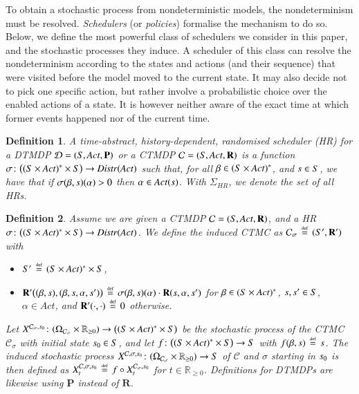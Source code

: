 \documentclass[10pt,twocolumn]{article}
\newtheorem{definition}{Definition}
\newcommand{\states} {{\ensuremath S}}
\newcommand{\state}  {{\ensuremath s}}
\newcommand{\distrs} {{\ensuremath {\mathit{Distr}}}}
\newcommand{\reals}  {{\ensuremath {\mathbb{R}}}}
\newcommand{\sched}  {{\ensuremath {\sigma}}}
\newcommand{\acts}{\mathit{Act}}
\newcommand{\pmat}{\mathbf{P}}
\newcommand{\rmat}{\mathbf{R}}
\newcommand{\dmodel}{\mathcal{D}}
\newcommand{\cmodel}{\mathcal{C}}
\newcommand{\mpath}{\beta}
\newcommand{\act}{\alpha}
\newcommand{\schedshr}{\Sigma_\mathit{HR}}
\newcommand{\stopro}{X}
\newcommand{\samspace}[1]{\Omega_{#1}}
\newcommand{\defeq}{\,\stackrel{\mbox{\rm {\tiny def}}}{=}\,}
\begin{document}
To obtain a stochastic process from nondeterministic models, the nondeterminism must be resolved.
\emph{Schedulers} (or \emph{policies}) formalise the mechanism to do so.
Below, we define the most powerful class of schedulers we consider in this paper, and the stochastic processes they induce.
A scheduler of this class can resolve the nondeterminism according to the states and actions (and their sequence) that were visited before the model moved to the current state.
It may also decide not to pick one specific action, but rather involve a probabilistic choice over the enabled actions of a state.
It is however neither aware of the exact time at which former events happened nor of the current time.
\begin{definition}
  \label{def:sched-hrs}
A \emph{time-abstract, history-dependent, ran\-dom\-ised scheduler (HR)} for a DTMDP
  $\dmodel = (\states, \acts, \pmat)$ or a CTMDP $\cmodel = (\states, \acts, \rmat)$
  is a function $\sched\colon \bigl((\states \times \acts)^* \times \states\bigr) \to \distrs(\acts)$
  such that, for all $\mpath \in (\states \times \acts)^*$, and $\state \in \states$,
  we have that if $\sched(\mpath, \state)(\act) > 0$ then $\act \in \acts(\state)$.
  With  $\schedshr$, we denote the set of all HRs.
\end{definition}

\begin{definition}
  Assume we are given a CTMDP $\cmodel = (\states, \acts, \rmat)$, and a HR
  $\sched\colon \bigl((\states \times \acts)^* \times \states\bigr) \to \distrs(\acts)$. We
  define the \emph{induced CTMC} as $\cmodel_\sched \defeq (\states', \rmat')$
  with
  \begin{itemize}
  \item $\states' \defeq (\states \times \acts)^* \times \states$,
  \item $\rmat'\bigl((\mpath,\state), (\mpath, \state, \act,\state')\bigr) \defeq
    \sched(\mpath, \state)(\act) \cdot \rmat(\state, \act, \state')$ for $\mpath
    \in (\states \times \acts)^*$, $\state, \state' \in \states$, $\act \in
    \acts$, and $\rmat'(\cdot,\cdot) \defeq 0$ otherwise.
  \end{itemize}
Let $\stopro^{\cmodel_\sched,\state_0}\colon (\samspace{\cmodel_\sched} \times
  \reals_{\geq 0}) \to \bigl((\states \times \acts)^* \times \states\bigr)$ be the stochastic
  process of the CTMC $\cmodel_\sched$ with initial state $\state_0 \in \states$,
  and let $f\colon \bigl((\states \times \acts)^* \times \states\bigr) \to \states$ with
  $f(\mpath, \state) \defeq \state$.
  The \emph{induced stochastic process} $\stopro^{\cmodel,\sched,\state_0}\colon
  (\samspace{\cmodel_\sched} \times \reals_{\geq 0}) \to \states$ of $\cmodel$ and
  $\sched$ starting in $\state_0$ is then defined as
  $\stopro^{\cmodel,\sched,\state_0}_t \defeq f \circ
  \stopro^{\cmodel_\sched,\state_0}_t$ for $t \in \reals_{\geq 0}$.
  Definitions for DTMDPs are likewise using $\pmat$ instead of $\rmat$.
\end{definition}
\end{document}
